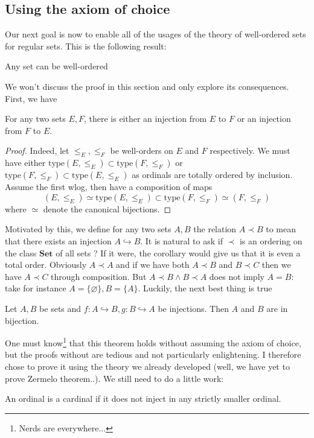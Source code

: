 \documentclass{article}
\begin{document}
\subsection{Using the axiom of choice}
Our next goal is now to enable all of the usages of the theory of well-ordered sets for regular sets. This is the following result:
\begin{theorem}
    Any set can be well-ordered
\end{theorem}

We won't discuss the proof in this section and only explore its consequences. First, we have
\begin{corollary}
    For any two sets $E, F$, there is either an injection from $E$ to $F$ or an injection from $F$ to $E$.
\end{corollary}
\begin{proof}
    Indeed, let $\leq_E, \leq_F$ be well-orders on $E$ and $F$ respectively. We must have either $\mathrm{type}(E, \leq_E) \subset \mathrm{type}(F, \leq_F)$ or $\mathrm{type}(F, \leq_F) \subset \mathrm{type}(E, \leq_E)$ as ordinals are totally ordered by inclusion. Assume the first wlog, then have a composition of maps
    $$(E, \leq_E) \simeq \mathrm{type}(E, \leq_E) \subset \mathrm{type}(F, \leq_F) \simeq (F, \leq_F) $$
    where $\simeq$ denote the canonical bijections.
\end{proof}

Motivated by this, we define for any two sets $A, B$ the relation $A \prec B$ to mean that there exists an injection $A \hookrightarrow B$. It is natural to ask if $\prec$ is an ordering on the class $\mathbf{Set}$ of all sets ? If it were, the corollary would give us that it is even a total order. Obviously $A \prec A$ and if we have both $A \prec B$ and $B \prec C$ then we have $A \prec C$ through composition. But $A \prec B \land B \prec A$ does not imply $A = B$: take for instance $A = \{\varnothing\}, B = \{A\}$. Luckily, the next best thing is true

\begin{theorem}
    Let $A, B$ be sets and $f: A \hookrightarrow B, g: B \hookrightarrow A$ be injections. Then $A$ and $B$ are in bijection.
\end{theorem}

One must know\footnote{Nerds are everywhere...} that this theorem holds without assuming the axiom of choice, but the proofs without are tedious and not particularly enlightening. I therefore chose to prove it using the theory we already developed (well, we have yet to prove Zermelo theorem..). We still need to do a little work:
\begin{definition}
    An ordinal is a cardinal if it does not inject in any strictly smaller ordinal.
\end{definition}
\end{document}
